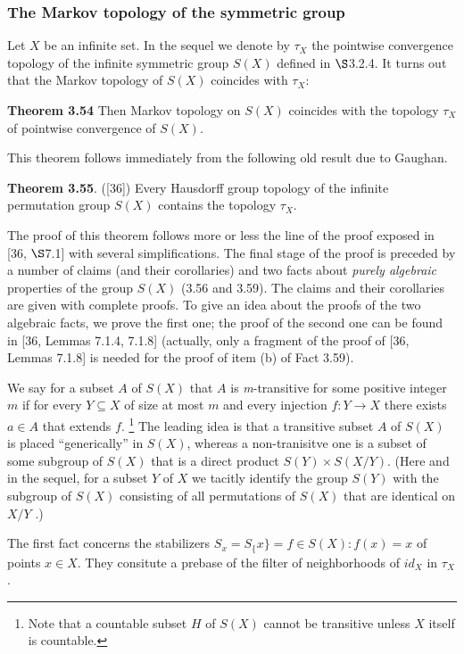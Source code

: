 \documentclass[12pt]{article}
\begin{document}
    \subsubsection{The Markov topology of the symmetric group}


        Let $X$ be an infinite set. In the sequel we denote by $\tau_X$ the pointwise convergence topology of the infinite
    symmetric group $S(X)$ defined in $\S$3.2.4. It turns out that the Markov topology of $S(X)$ coincides with $\tau_X$:
    
    
    \textbf{Theorem 3.54} Then Markov topology on $S(X)$ coincides with the topology $\tau_X$ of pointwise convergence of
    $S(X)$.


        This theorem follows immediately from the following old result due to Gaughan.

    
    \textbf{Theorem 3.55}. ([36]) Every Hausdorff group topology of the infinite permutation group $S(X)$ contains the
    topology $\tau_X$.
    
    
        The proof of this theorem follows more or less the line of the proof exposed in [36, $\S$7.1] with several
    simplifications. The final stage of the proof is preceded by a number of claims (and their corollaries) and two
    facts about \emph{purely algebraic} properties of the group $S(X)$ (3.56 and 3.59). The claims and their corollaries are
    given with complete proofs. To give an idea about the proofs of the two algebraic facts, we prove the first one;
    the proof of the second one can be found in [36, Lemmas 7.1.4, 7.1.8] (actually, only a fragment of the proof of
    [36, Lemmas 7.1.8] is needed for the proof of item (b) of Fact 3.59).
    
    
        We say for a subset $A$ of $S(X)$ that $A$ is \emph{m}-transitive for some positive integer $m$ if for every $Y \subseteq X$ of
    size at most $m$ and every injection $f : Y \to X$ there exists $a \in A$ that extends $f$.
    \footnote[5]{Note that a countable subset $H$ of $S(X)$ cannot be transitive unless $X$ itself is countable.}
    The leading idea is that a transitive subset $A$ of $S(X)$ is placed “generically” in $S(X)$, whereas a non-tranisitve one is a subset of some
    subgroup of $S(X)$ that is a direct product $S(Y ) \times S(X / Y )$. (Here and in the sequel, for a subset $Y$ of $X$
    we tacitly identify the group $S(Y)$ with the subgroup of $S(X)$ consisting of all permutations of $S(X)$ that are
    identical on $X / Y$ .)
    
    
        The first fact concerns the stabilizers $S_x = S_\{x\} = {f \in S(X) : f(x) = x}$ of points $x \in X$. They consitute
    a prebase of the filter of neighborhoods of $id_X$ in $\tau_X$.
\end{document}
